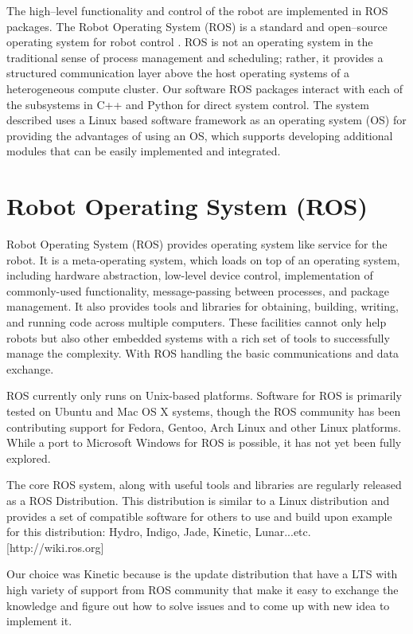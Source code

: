
The high–level functionality and control of the robot are implemented in ROS packages. The Robot Operating System (ROS) is a standard and open–source operating system for robot control \cite{9}. ROS is not an operating system in the traditional sense of process management and scheduling; rather, it provides a structured communication layer above the host operating systems of a heterogeneous compute cluster. Our software ROS packages interact with each of the subsystems in C++ and Python for direct system control. The system described uses a Linux based software framework as an operating system (OS) for providing the advantages of using an OS, which supports developing additional modules that can be easily implemented and integrated. 

\section{Robot Operating System (ROS)}

Robot Operating System (ROS) provides operating system like service for the robot. It is a meta-operating system, which loads on top of an operating system, including hardware abstraction, low-level device control, implementation of commonly-used functionality, message-passing between processes, and package management. It also provides tools and libraries for obtaining, building, writing, and running code across multiple computers. These facilities cannot only help robots but also other embedded systems with a rich set of tools to successfully manage the complexity. With ROS handling the basic communications and data exchange.

ROS currently only runs on Unix-based platforms. Software for ROS is primarily tested on Ubuntu and Mac OS X systems, though the ROS community has been contributing support for Fedora, Gentoo, Arch Linux and other Linux platforms. While a port to Microsoft Windows for ROS is possible, it has not yet been fully explored.

The core ROS system, along with useful tools and libraries are regularly released as a ROS Distribution. This distribution is similar to a Linux distribution and provides a set of compatible software for others to use and build upon example for this distribution: Hydro, Indigo, Jade, Kinetic, Lunar...etc. [http://wiki.ros.org]

Our choice was Kinetic because is the update  distribution that have a LTS with high variety of support from ROS community that make it easy to exchange the knowledge and figure out how to solve issues and to come up with new idea to implement it. 
